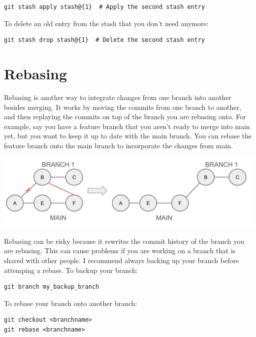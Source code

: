 \documentclass[fleqn]{article}
\begin{document}
\begin{lstlisting}
git stash apply stash@{1}  # Apply the second stash entry
\end{lstlisting}

To delete an old entry from the stash that you don't need anymore:

\begin{lstlisting}
git stash drop stash@{1}  # Delete the second stash entry
\end{lstlisting}

\pagebreak

\section*{Rebasing}

Rebasing is another way to integrate changes from one branch into another
besides merging. It works by moving the commits from one branch to another, and
then replaying the commits on top of the branch you are rebasing onto. For
example, say you have a feature branch that you aren't ready to merge into main
yet, but you want to keep it up to date with the main branch. You can rebase the
feature branch onto the main branch to incorporate the changes from main.

\begin{center}
    \includegraphics[scale=0.4]{figs/rebase.png}
\end{center}

Rebasing can be risky because it rewrites the commit history of the branch you
are rebasing. This can cause problems if you are working on a branch that is
shared with other people. I recommend always backing up your branch before 
attemping a rebase. To backup your branch:

\begin{lstlisting}
git branch my_backup_branch
\end{lstlisting}

To rebase your branch onto another branch:

\begin{lstlisting}
git checkout <branchname>
git rebase <branchname>
\end{lstlisting}
\end{document}
